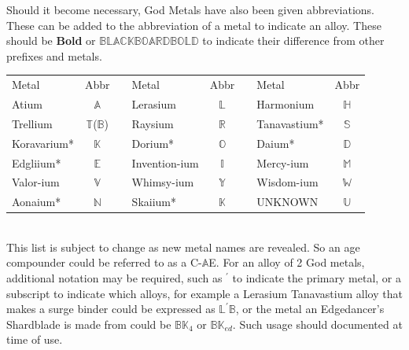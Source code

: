 \documentclass[conference]{IEEEtran}
\newcommand{\n}{\hfill\break}
\begin{document}
Should it become necessary, God Metals have also been given abbreviations.  These can be added to the abbreviation of a metal to indicate an alloy.  These should be \textbf{Bold} or $\mathbb{BLACK BOARD BOLD}$ to indicate their difference from other prefixes and metals.\\\n
\setlength{\tabcolsep}{.5\tabcolsep}
\begin{tabular}{|l |c |c|l |c |c|l |c | }
	
	\cline{1-2}\cline{4-5}\cline{7-8}
	Metal&Abbr&&Metal&Abbr&&Metal&Abbr\\
	\cline{1-2}\cline{4-5}\cline{7-8}
	
	\cline{1-2}\cline{4-5}\cline{7-8}
	Atium & $\mathbb{A}$&&  Lerasium & $\mathbb{L}$ && 	Harmonium & $\mathbb{H}$ \\ 
	\cline{1-2}\cline{4-5}\cline{7-8}
	Trellium & $\mathbb{T}$($\mathbb{B}$) && Raysium &$\mathbb{R}$ &&  	Tanavastium* & $\mathbb{S}$\\
	\cline{1-2}\cline{4-5}\cline{7-8}
	Koravarium* & $\mathbb{K}$ && Dorium*& $\mathbb{O}$ &&  Daium* & $\mathbb{D}$\\
	\cline{1-2}\cline{4-5}\cline{7-8}
	Edgliium* & $\mathbb{E}$ &&	Invention-ium&$\mathbb{I}$  &&Mercy-ium & $\mathbb{M}$  \\
	\cline{1-2}\cline{4-5}\cline{7-8}
	Valor-ium & $\mathbb{V}$&&	Whimsy-ium & $\mathbb{Y}$ && Wisdom-ium &$\mathbb{W}$\\
	\cline{1-2}\cline{4-5}\cline{7-8}
	Aonaium* & $\mathbb{N}$ &&Skaiium* & $\mathbb{K}$ && UNKNOWN & $\mathbb{U}$ \\
	\cline{1-2}\cline{4-5}\cline{7-8}
\end{tabular}\\\n
This list is subject to change as new metal names are revealed.  
So an age compounder could be referred to as a C-$\mathbb{A}$E.  For an alloy of 2 God metals, additional notation may be required, such as $^\prime$ to indicate the primary metal, or a subscript to indicate which alloys, for example a Lerasium Tanavastium alloy that makes a surge binder could be expressed as $\mathbb{L}^\prime\mathbb{B}$, or the metal an Edgedancer's Shardblade is made from could be $\mathbb{BK}_4$ or $\mathbb{BK}_{ed}$.  Such usage should documented at time of use.
\\\n
{}
 
 
 
 
 
 
 
 
 
 
\end{document}
